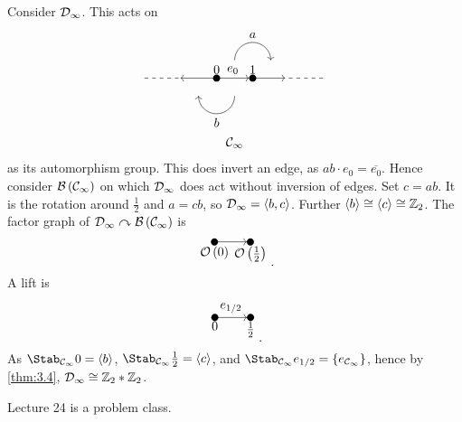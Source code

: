 \begin{example}
Consider $ \mathcal{D}_\infty $. This acts on
$$
\begin{array}{c}
\begin{tikzpicture}
\fill (0, 0) circle (0.1) node[above]{$ 0 $};
\fill (1, 0) circle (0.1) node[above]{$ 1 $};
\draw [dashed] (-2, 0) to (-1, 0);
\draw [->] (0, 0) to (-1, 0);
\draw [->] (0, 0) to node[above]{$ e_0 $} (0.9, 0);
\draw [->] (1, 0) to (1.9, 0);
\draw [dashed] (2, 0) to (3, 0);
\draw [->] (0.5, 0.5) arc (180:0:0.5);
\draw [->] (0.5, -0.5) arc (0:-180:0.5);
\fill (1, 1) node[above]{$ a $};
\fill (0, -1) node[below]{$ b $};
\end{tikzpicture}
\\
\CCC_\infty
\end{array}
$$
as its automorphism group. This does invert an edge, as $ ab \cdot e_0 = \overline{e_0} $. Hence consider $ \BBB\br{\CCC_\infty} $ on which $ \mathcal{D}_\infty $ does act without inversion of edges. Set $ c = ab $. It is the rotation around $ \tfrac{1}{2} $ and $ a = cb $, so $ \mathcal{D}_\infty = \left\langle b, c \right\rangle $. Further $ \left\langle b \right\rangle \cong \left\langle c \right\rangle \cong \mathbb{Z}_2 $. The factor graph of $ \DDD_\infty \curvearrowright \BBB\br{\CCC_\infty} $ is
$$
\begin{tikzpicture}
\fill (0, 0) circle (0.1) node[below]{$ \OOO\br{0} $};
\fill (1, 0) circle (0.1) node[below]{$ \OOO\br{\tfrac{1}{2}} $};
\draw [->] (0, 0) to (0.9, 0);
\end{tikzpicture}.
$$
A lift is
$$
\begin{tikzpicture}
\fill (0, 0) circle (0.1) node[below]{$ 0 $};
\fill (1, 0) circle (0.1) node[below]{$ \tfrac{1}{2} $};
\draw [->] (0, 0) to node[above]{$ e_{1 / 2} $} (0.9, 0);
\end{tikzpicture}.
$$
As $ \Stab_{\CCC_\infty} 0 = \abr{b} $, $ \Stab_{\CCC_\infty} \tfrac{1}{2} = \abr{c} $, and $ \Stab_{\CCC_\infty} e_{1 / 2} = \cbr{e_{\CCC_\infty}} $, hence by \ref{thm:3.4}, $ \mathcal{D}_\infty \cong \mathbb{Z}_2 * \mathbb{Z}_2 $.
\end{example}


Lecture 24 is a problem class.

